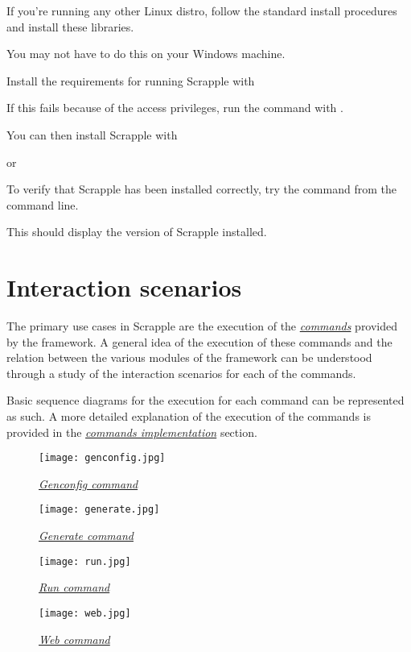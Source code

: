 \documentclass[letterpaper,12pt,english]{sphinxmanual}
\begin{document}

If you're running any other Linux distro, follow the standard install procedures and install these libraries.

You may not have to do this on your Windows machine.

Install the requirements for running Scrapple with


If this fails because of the access privileges, run the command with .

You can then install Scrapple with

 or 

To verify that Scrapple has been installed correctly, try the  command from the command line.


This should display the version of Scrapple installed.


\chapter{Interaction scenarios}
\label{index:interaction-scenarios}
The primary use cases in Scrapple are the execution of the {\hyperref[framework/commands:framework-commands]{\emph{commands}}} provided by the framework. A general idea of the execution of these commands and the relation between the various modules of the framework can be understood through a study of the interaction scenarios for each of the commands.

Basic sequence diagrams for the execution for each command can be represented as such. A more detailed explanation of the execution of the commands is provided in the {\hyperref[implementation/commands:implementation-commands]{\emph{commands implementation}}} section.
\begin{figure}[htbp]
\centering
\capstart

\texttt{[image: genconfig.jpg]}
\caption{{\hyperref[framework/commands:command-genconfig]{\emph{Genconfig command}}}}\end{figure}
\begin{figure}[htbp]
\centering
\capstart

\texttt{[image: generate.jpg]}
\caption{{\hyperref[framework/commands:command-generate]{\emph{Generate command}}}}\end{figure}
\begin{figure}[htbp]
\centering
\capstart

\texttt{[image: run.jpg]}
\caption{{\hyperref[framework/commands:command-run]{\emph{Run command}}}}\end{figure}
\begin{figure}[htbp]
\centering
\capstart

\texttt{[image: web.jpg]}
\caption{{\hyperref[framework/commands:command-web]{\emph{Web command}}}}\end{figure}
\end{document}
